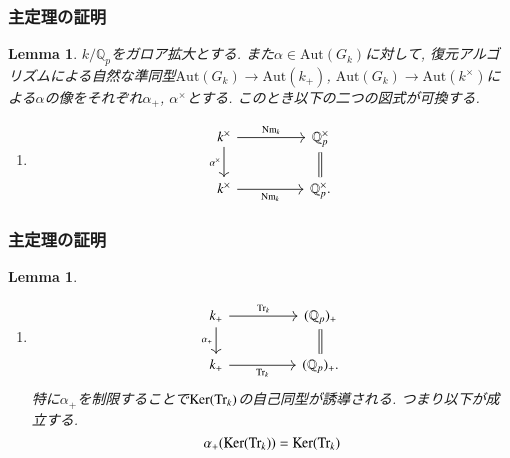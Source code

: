 \documentclass[dvipdfmx,19.8pt]{beamer}
\theoremstyle{theorem}
\newtheorem{lem}[theorem]{Lemma}
\theoremstyle{definition}
\def\bQ{{\mathbb Q}}
\def\Aut{{\mathrm{Aut}}}
\begin{document}
\begin{frame}[fragile]
	\frametitle{主定理の証明}

\begin{lem}\label{plus:times:lemma}
$k/\bQ_p$をガロア拡大とする. また$\alpha \in \Aut(G_k)$に対して, 復元アルゴリズムによる自然な準同型$\Aut(G_k) \rightarrow \Aut(k_+)$, $\Aut(G_k) \rightarrow \Aut(k^\times)$による$\alpha$の像をそれぞれ$\alpha_+$, $\alpha^\times$とする. このとき以下の二つの図式が可換する. 
\begin{enumerate}[label=(\roman*),ref=(\roman*)]
   \item[\rm (i)] 
\[
\begin{tikzcd}
k^\times \arrow[rr, "{\rm Nm}_k"] \arrow[d, "\alpha^\times"'] && \bQ_p^\times \arrow[d, equal] \\
k^\times \arrow[rr, "{\rm Nm}_k"']                         && \bQ_p^\times.                
\end{tikzcd}
\]\label{lemma:2.2:statement:1}
\end{enumerate} \label{lemma:2.2:statement:2}
\end{lem}


\end{frame}







\begin{frame}[fragile]
	\frametitle{主定理の証明}
\begin{lem}\label{Norm:Trace:lemma}
\begin{enumerate}[label=(\roman*),ref=(\roman*)]
   \item[\rm (ii)] 
\[
\begin{tikzcd}
k_{+} \arrow[rr, "{\rm Tr}_k"] \arrow[d, "\alpha_{+}"'] && (\bQ_p)_+ \arrow[d, equal] \\
k_{+} \arrow[rr, "{\rm Tr}_k"']                         && (\bQ_p)_+.                
\end{tikzcd}
\]
特に$\alpha_+$を制限することで${\rm Ker}({\rm Tr}_k)$の自己同型が誘導される. つまり以下が成立する. 
\[
\alpha_+({\rm Ker}({\rm Tr}_k)) = {\rm Ker}({\rm Tr}_k)
\]
\end{enumerate} \label{lemma:2.2:statement:2}
\end{lem}


\end{frame}
\end{document}
